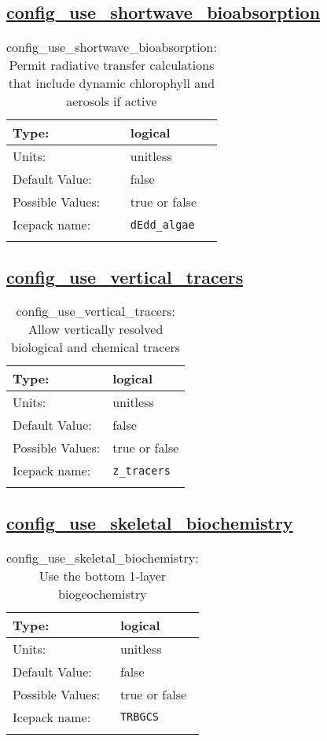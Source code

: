\subsection[config\_use\_shortwave\_bioabsorption]{\hyperref[sec:nm_tab_biogeochemistry]{config\_use\_shortwave\_bioabsorption}}
\label{subsec:nm_sec_config_use_shortwave_bioabsorption}
\begin{center}
\begin{longtable}{| p{2.0in} || p{4.0in} |}
    \hline
    Type: & logical \\
    \hline
    Units: & \si{unitless} \\
    \hline
    Default Value: & false \\
    \hline
    Possible Values: & true or false \\
    \hline
    Icepack name: & \verb+dEdd_algae+ \\
    \hline
    \caption{config\_use\_shortwave\_bioabsorption: Permit radiative transfer calculations that include dynamic chlorophyll and aerosols if active}
\end{longtable}
\end{center}
\subsection[config\_use\_vertical\_tracers]{\hyperref[sec:nm_tab_biogeochemistry]{config\_use\_vertical\_tracers}}
\label{subsec:nm_sec_config_use_vertical_tracers}
\begin{center}
\begin{longtable}{| p{2.0in} || p{4.0in} |}
    \hline
    Type: & logical \\
    \hline
    Units: & \si{unitless} \\
    \hline
    Default Value: & false \\
    \hline
    Possible Values: & true or false \\
    \hline
    Icepack name: & \verb+z_tracers+ \\
    \hline
    \caption{config\_use\_vertical\_tracers: Allow vertically resolved biological and chemical tracers}
\end{longtable}
\end{center}
\subsection[config\_use\_skeletal\_biochemistry]{\hyperref[sec:nm_tab_biogeochemistry]{config\_use\_skeletal\_biochemistry}}
\label{subsec:nm_sec_config_use_skeletal_biochemistry}
\begin{center}
\begin{longtable}{| p{2.0in} || p{4.0in} |}
    \hline
    Type: & logical \\
    \hline
    Units: & \si{unitless} \\
    \hline
    Default Value: & false \\
    \hline
    Possible Values: & true or false \\
    \hline
    Icepack name: & \verb+TRBGCS+ \\
    \hline
    \caption{config\_use\_skeletal\_biochemistry: Use the bottom 1-layer biogeochemistry}
\end{longtable}
\end{center}

